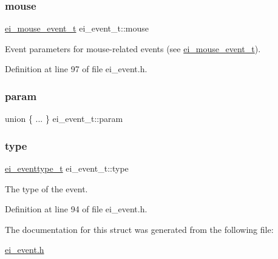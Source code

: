 \subsubsection{\texorpdfstring{mouse}{mouse}}
{\footnotesize\ttfamily \hyperlink{structei__mouse__event__t}{ei\+\_\+mouse\+\_\+event\+\_\+t} ei\+\_\+event\+\_\+t\+::mouse}



Event parameters for mouse-\/related events (see \hyperlink{structei__mouse__event__t}{ei\+\_\+mouse\+\_\+event\+\_\+t}). 



Definition at line 97 of file ei\+\_\+event.\+h.

\mbox{\label{structei__event__t_a03a01773dff790d4b772f6b16e4fbb4b}} 
\subsubsection{\texorpdfstring{param}{param}}
{\footnotesize\ttfamily union \{ ... \}   ei\+\_\+event\+\_\+t\+::param}

\mbox{\label{structei__event__t_aee18f11986ed603959de628558812c58}} 
\subsubsection{\texorpdfstring{type}{type}}
{\footnotesize\ttfamily \hyperlink{ei__event_8h_a132dde064150d861ad24e9d839cbe007}{ei\+\_\+eventtype\+\_\+t} ei\+\_\+event\+\_\+t\+::type}



The type of the event. 



Definition at line 94 of file ei\+\_\+event.\+h.



The documentation for this struct was generated from the following file\+:\begin{DoxyCompactItemize}
\item 
\hyperlink{ei__event_8h}{ei\+\_\+event.\+h}\end{DoxyCompactItemize}
